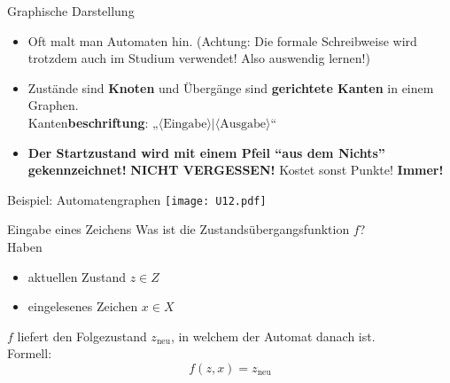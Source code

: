 \begin{frame}{}
	\begin{block}{Graphische Darstellung}
		\begin{itemize}
			\item Oft malt man Automaten hin. (Achtung: Die formale Schreibweise wird trotzdem auch im Studium verwendet! Also auswendig lernen!)
			\item Zustände sind \textbf{Knoten} und Übergänge sind \textbf{gerichtete Kanten} in einem Graphen. \\
			Kanten\textbf{beschriftung}: „$\langle\text{Eingabe}\rangle | \langle\text{Ausgabe}\rangle$“
			\item \textbf{Der Startzustand wird mit einem Pfeil \enquote{aus dem Nichts} gekennzeichnet!}  \pause
			\implitem \textbf{NICHT VERGESSEN!} Kostet sonst Punkte! \textbf{Immer!}
		\end{itemize}
		
	\end{block}
\end{frame}

\begin{frame}{Beispiel: Automatengraphen}
	\texttt{[image: U12.pdf]}	
\end{frame}



\begin{frame}{Eingabe eines Zeichens}
	Was ist die Zustandsübergangsfunktion $f$? \\ \pause
	\medskip
	Haben
	\begin{itemize}
		\item aktuellen Zustand $z \in Z$
		\item eingelesenes Zeichen $x \in X$
	\end{itemize}
	\impl $f$ liefert den Folgezustand $z_\text{neu}$, in welchem der Automat danach ist.\\
	\medskip
	Formell: $$ f(z,x) = z_\text{neu} $$ 
\end{frame}

